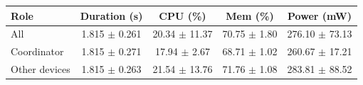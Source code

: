 \begin{tabular}{lcccc}
\hline
\textbf{Role} & \textbf{Duration (s)} & \textbf{CPU (\%)} & \textbf{Mem (\%)} & \textbf{Power (mW)} \\
\hline
All & 1.815 $\pm$ 0.261 & 20.34 $\pm$ 11.37 & 70.75 $\pm$ 1.80 & 276.10 $\pm$ 73.13 \\
Coordinator & 1.815 $\pm$ 0.271 & 17.94 $\pm$ 2.67 & 68.71 $\pm$ 1.02 & 260.67 $\pm$ 17.21 \\
Other devices & 1.815 $\pm$ 0.263 & 21.54 $\pm$ 13.76 & 71.76 $\pm$ 1.08 & 283.81 $\pm$ 88.52 \\
\hline
\end{tabular}
